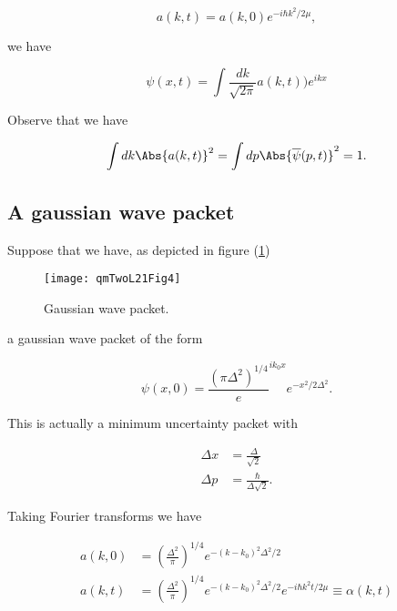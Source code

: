 \begin{equation}\label{eqn:qmTwoL21:290}
a(k, t) = a(k, 0) e^{ -i \hbar k^2/2 \mu},
\end{equation}

we have

\begin{equation}\label{eqn:qmTwoL21:310}
\psi(x, t) = \int \frac{dk}{\sqrt{2 \pi}} a(k, t) ) e^{i k x} 
\end{equation}

Observe that we have

\begin{equation}\label{eqn:qmTwoL21:330}
\int dk \Abs{ a(k, t)}^2 = \int dp \Abs{ \overline{\psi}(p, t)}^2 = 1.
\end{equation}

\subsection{A gaussian wave packet}

Suppose that we have, as depicted in figure (\ref{fig:qmTwoL21:qmTwoL21Fig4})
\begin{figure}[htp]
   \centering
   \texttt{[image: qmTwoL21Fig4]}
   \caption{Gaussian wave packet.}\label{fig:qmTwoL21:qmTwoL21Fig4}
\end{figure}

a gaussian wave packet of the form

\begin{equation}\label{eqn:qmTwoL21:350}
\psi(x, 0) = \frac{ (\pi \Delta^2)^{1/4}} e^{i k_0 x} e^{- x^2/2 \Delta^2}.
\end{equation}

This is actually a minimum uncertainty packet with 

\begin{align}\label{eqn:qmTwoL21:370}
\Delta x &= \frac{\Delta}{\sqrt{2}} \\
\Delta p &= \frac{\hbar}{\Delta \sqrt{2}}.
\end{align}

Taking Fourier transforms we have

\begin{align}\label{eqn:qmTwoL21:390}
a(k, 0) &= \left(\frac{\Delta^2}{\pi}\right)^{1/4} e^{-(k - k_0)^2 \Delta^2/2} \\
a(k, t) &= \left(\frac{\Delta^2}{\pi}\right)^{1/4} e^{-(k - k_0)^2 \Delta^2/2} e^{ -i \hbar k^2 t/ 2\mu} \equiv \alpha(k, t)
\end{align}

